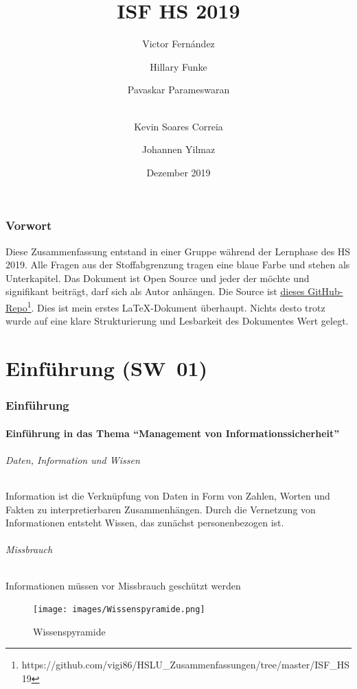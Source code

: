 \documentclass[10pt,a4paper]{article}
\title{ISF HS 2019}
\author[1]{Victor Fernández}
\author[2]{Hillary Funke}
\author[3]{Pavaskar Parameswaran}
\author[3]{\\Kevin Soares Correia}
\author[2]{Johannen Yilmaz}
\affil[1]{HSLU Informatik}
\affil[2]{HSLU Information and Cybersecurity}
\affil[3]{HSLU Wirtschaftsinformatik}
\date{Dezember 2019}
\begin{document}
\maketitle
\thispagestyle{empty}
\section*{Vorwort}Diese Zusammenfassung entstand in einer Gruppe während der Lernphase des HS 2019. Alle Fragen aus der Stoffabgrenzung tragen eine {\color{dunkelblau}blaue Farbe} und stehen als Unterkapitel. Das Dokument ist Open Source und jeder der möchte und signifikant beiträgt, darf sich als Autor anhängen. Die Source ist \underline{\href{https://github.com/vigi86/HSLU_Zusammenfassungen/tree/master/ISF_HS19}{dieses GitHub-Repo}}\footnote{https://github.com/vigi86/HSLU\_Zusammenfassungen/tree/master/ISF\_HS19}. Dies ist mein erstes \LaTeX{}-Dokument überhaupt. Nichts desto trotz wurde auf eine klare Strukturierung und Lesbarkeit des Dokumentes Wert gelegt.
\tableofcontents
\thispagestyle{empty}
\pagebreak


\part{Einführung (SW~01)}
\section{Einführung}
\subsection*{Einführung in das Thema "`Management von Informationssicherheit"'}
\paragraph*{Daten, Information und Wissen}
Information ist die Verknüpfung von Daten in Form von Zahlen, Worten und Fakten zu interpretierbaren Zusammenhängen.
Durch die Vernetzung von Informationen entsteht Wissen, das zunächst personenbezogen ist.

\paragraph*{Missbrauch}Informationen müssen vor Missbrauch geschützt werden
\begin{figure}[H]
    \begin{center}
    \texttt{[image: images/Wissenspyramide.png]}
    \caption{Wissenspyramide\cite{wiki}}
    \label{Wissenspyramide}
    \end{center}
\end{figure}
\end{document}
